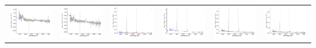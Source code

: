 \begin{center}
\begin{longtable}{l l l l l l }
    \includegraphics[width=0.3\linewidth, clip]{Figs/Figs-sdss/spec-0514-51994-0016-SPLUS-n02n21-042463.pdf} & \includegraphics[width=0.3\linewidth, clip]{Figs/Figs-sdss/spec-0515-52051-0011-SPLUS-n02n22-059209.pdf} & \includegraphics[width=0.3\linewidth, clip]{Figs/Figs-sdss/spec-0519-52283-0278-SPLUS-n02n26-032045.pdf} & \includegraphics[width=0.3\linewidth, clip]{Figs/Figs-sdss/spec-0519-52283-0291-SPLUS-n02n26-039812.pdf} & \includegraphics[width=0.3\linewidth, clip]{Figs/Figs-sdss/spec-0520-52288-0312-SPLUS-n02n28-039381.pdf} & \includegraphics[width=0.3\linewidth, clip]{Figs/Figs-sdss/spec-0530-52026-0013-SPLUS-n02n44-027436.pdf} \\

\end{longtable}
\end{center}
